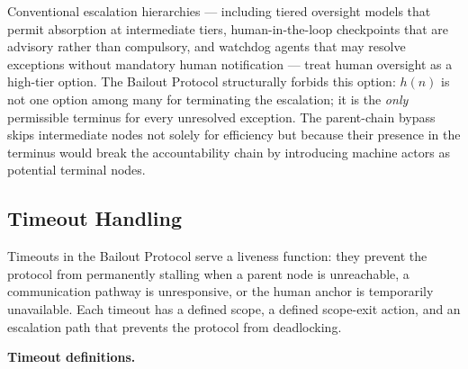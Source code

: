Conventional escalation hierarchies — including tiered oversight models that permit absorption at intermediate tiers, human-in-the-loop checkpoints that are advisory rather than compulsory, and watchdog agents that may resolve exceptions without mandatory human notification — treat human oversight as a high-tier option. The Bailout Protocol structurally forbids this option: $h(n)$ is not one option among many for terminating the escalation; it is the \emph{only} permissible terminus for every unresolved exception. The parent-chain bypass skips intermediate nodes not solely for efficiency but because their presence in the terminus would break the accountability chain by introducing machine actors as potential terminal nodes.

\subsection{Timeout Handling}\label{sec:timeout-handling}

Timeouts in the Bailout Protocol serve a liveness function: they prevent the protocol from permanently stalling when a parent node is unreachable, a communication pathway is unresponsive, or the human anchor is temporarily unavailable. Each timeout has a defined scope, a defined scope-exit action, and an escalation path that prevents the protocol from deadlocking.

\bigskip
\noindent\textbf{Timeout definitions.}

